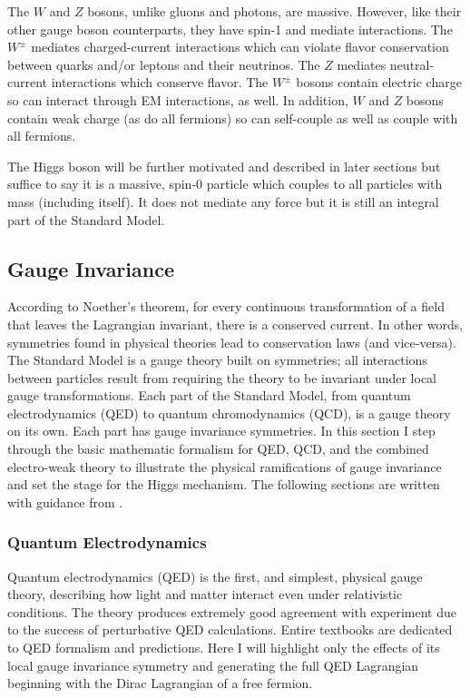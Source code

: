 The $W$ and $Z$ bosons, unlike gluons and photons, are massive. However, like their other gauge boson counterparts, they have spin-1 and mediate interactions. The $W^{\pm}$ mediates charged-current interactions which can violate flavor conservation between quarks and/or leptons and their neutrinos. The $Z$ mediates neutral-current interactions which conserve flavor. The $W^{\pm}$ bosons contain electric charge so can interact through EM interactions, as well. In addition, $W$ and $Z$ bosons contain weak charge (as do all fermions) so can self-couple as well as couple with all fermions. 
 
The Higgs boson will be further motivated and described in later sections but suffice to say it is a massive, spin-0 particle which couples to all particles with mass (including itself). It does not mediate any force but it is still an integral part of the Standard Model.  

\subsection{Gauge Invariance}
According to Noether's theorem, for every continuous transformation of a field that leaves the Lagrangian invariant, there is a conserved current. In other words, symmetries found in physical theories lead to conservation laws (and vice-versa). The Standard Model is a gauge theory built on symmetries; all interactions between particles result from requiring the theory to be invariant under local gauge transformations. Each part of the Standard Model, from quantum electrodynamics (QED) to quantum chromodynamics (QCD), is a gauge theory on its own. Each part has gauge invariance symmetries. In this section I step through the basic mathematic formalism for QED, QCD, and the combined electro-weak theory to illustrate the physical ramifications of gauge invariance and set the stage for the Higgs mechanism. The following sections are written with guidance from \cite{HalzenMartin}. 

\subsubsection{Quantum Electrodynamics}
Quantum electrodynamics (QED) is the first, and simplest, physical gauge theory, describing how light and matter interact even under relativistic conditions. The theory produces extremely good agreement with experiment due to the success of perturbative QED calculations. Entire textbooks are dedicated to QED formalism and predictions. Here I will highlight only the effects of its local gauge invariance symmetry and generating the full QED Lagrangian beginning with the Dirac Lagrangian of a free fermion. 

